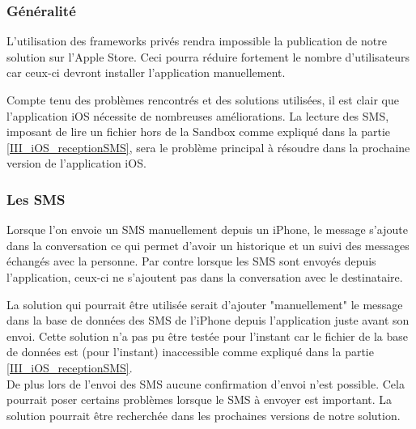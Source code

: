 
\subsubsection{Généralité}

L'utilisation des frameworks privés rendra impossible la publication de notre solution sur l'Apple Store.
Ceci pourra réduire fortement le nombre d'utilisateurs car ceux-ci devront installer l'application manuellement. 

Compte tenu des problèmes rencontrés et des solutions utilisées, il est clair que l'application iOS nécessite de nombreuses améliorations.
La lecture des SMS, imposant de lire un fichier hors de la Sandbox comme expliqué dans la partie \ref{III_iOS_receptionSMS}, sera le problème principal à résoudre dans la prochaine version de l'application iOS.


\subsubsection{Les SMS}

Lorsque l'on envoie un SMS manuellement depuis un iPhone, le message s'ajoute dans la conversation ce qui permet d'avoir un historique et un suivi des messages échangés avec la personne.
Par contre lorsque les SMS sont envoyés depuis l'application, ceux-ci ne s'ajoutent pas dans la conversation avec le destinataire.

La solution qui pourrait être utilisée serait d'ajouter "manuellement" le message dans la base de données des SMS de l'iPhone depuis l'application juste avant son envoi.
Cette solution n'a pas pu être testée pour l'instant car le fichier de la base de données est (pour l'instant) inaccessible comme expliqué dans la partie \ref{III_iOS_receptionSMS}.
\\

De plus lors de l'envoi des SMS aucune confirmation d'envoi n'est possible.
Cela pourrait poser certains problèmes lorsque le SMS à envoyer est important.
La solution pourrait être recherchée dans les prochaines versions de notre solution.






